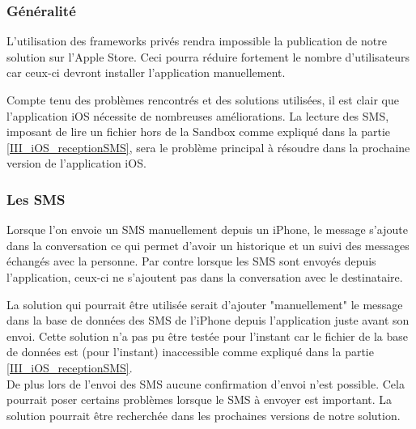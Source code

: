 
\subsubsection{Généralité}

L'utilisation des frameworks privés rendra impossible la publication de notre solution sur l'Apple Store.
Ceci pourra réduire fortement le nombre d'utilisateurs car ceux-ci devront installer l'application manuellement. 

Compte tenu des problèmes rencontrés et des solutions utilisées, il est clair que l'application iOS nécessite de nombreuses améliorations.
La lecture des SMS, imposant de lire un fichier hors de la Sandbox comme expliqué dans la partie \ref{III_iOS_receptionSMS}, sera le problème principal à résoudre dans la prochaine version de l'application iOS.


\subsubsection{Les SMS}

Lorsque l'on envoie un SMS manuellement depuis un iPhone, le message s'ajoute dans la conversation ce qui permet d'avoir un historique et un suivi des messages échangés avec la personne.
Par contre lorsque les SMS sont envoyés depuis l'application, ceux-ci ne s'ajoutent pas dans la conversation avec le destinataire.

La solution qui pourrait être utilisée serait d'ajouter "manuellement" le message dans la base de données des SMS de l'iPhone depuis l'application juste avant son envoi.
Cette solution n'a pas pu être testée pour l'instant car le fichier de la base de données est (pour l'instant) inaccessible comme expliqué dans la partie \ref{III_iOS_receptionSMS}.
\\

De plus lors de l'envoi des SMS aucune confirmation d'envoi n'est possible.
Cela pourrait poser certains problèmes lorsque le SMS à envoyer est important.
La solution pourrait être recherchée dans les prochaines versions de notre solution.






